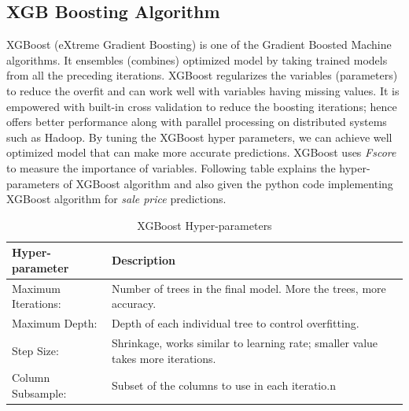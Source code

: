 \documentclass[sigconf]{acmart}
\begin{document}
	\subsection{XGB Boosting Algorithm}
	
	XGBoost (eXtreme Gradient Boosting) is one of the Gradient Boosted Machine algorithms. It ensembles (combines) optimized model by taking trained models from all the preceding iterations. XGBoost regularizes the variables (parameters) to reduce the overfit and can work well with variables having missing values. It is empowered with built-in cross validation to reduce the boosting iterations; hence offers better performance along with parallel processing on distributed systems such as Hadoop. By tuning the XGBoost hyper parameters, we can achieve well optimized model that can make more accurate predictions. XGBoost uses {\em Fscore} to measure the importance of  variables. Following table explains the hyper-parameters of XGBoost algorithm and also given the python code implementing XGBoost algorithm for {\em sale price} predictions.
	
	\begin{table}[H]
		\center
		\caption{XGBoost Hyper-parameters}
		\label{tab:xgb_param}		
		\begin{tabular}{l p{5cm}}
			\toprule
			Hyper-parameter & Description \\
			\midrule
			Maximum Iterations: & Number of trees in the final model. More the trees, more accuracy. \\
			
			Maximum Depth: & Depth of each individual tree to control overfitting. \\
			
			Step Size: & Shrinkage, works similar to learning rate; smaller value takes more iterations. \\
			
			Column Subsample: & Subset of the columns to use in each iteratio.n \\ 
			\bottomrule
		\end{tabular}
	\end{table}
	
\end{document}
